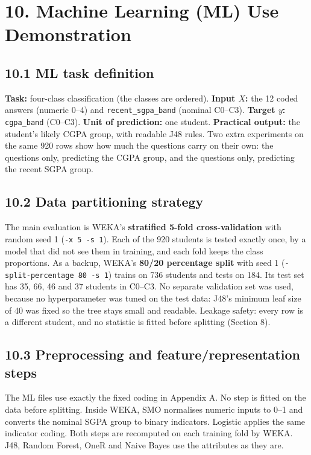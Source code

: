 \documentclass[11pt,a4paper]{article}
\begin{document}
\section{10. Machine Learning (ML) Use Demonstration}
\subsection{10.1 ML task definition}
\textbf{Task:} four-class classification (the classes are ordered). \textbf{Input $X$:} the 12 coded answers (numeric 0--4) and \texttt{recent\_sgpa\_band} (nominal C0--C3). \textbf{Target $y$:} \texttt{cgpa\_band} (C0--C3). \textbf{Unit of prediction:} one student. \textbf{Practical output:} the student's likely CGPA group, with readable J48 rules. Two extra experiments on the same 920 rows show how much the questions carry on their own: the questions only, predicting the CGPA group, and the questions only, predicting the recent SGPA group.

\subsection{10.2 Data partitioning strategy}
The main evaluation is WEKA's \textbf{stratified 5-fold cross-validation} with random seed 1 (\texttt{-x 5 -s 1}). Each of the 920 students is tested exactly once, by a model that did not see them in training, and each fold keeps the class proportions. As a backup, WEKA's \textbf{80/20 percentage split} with seed 1 (\texttt{-split-percentage 80 -s 1}) trains on 736 students and tests on 184. Its test set has 35, 66, 46 and 37 students in C0--C3. No separate validation set was used, because no hyperparameter was tuned on the test data: J48's minimum leaf size of 40 was fixed so the tree stays small and readable. Leakage safety: every row is a different student, and no statistic is fitted before splitting (Section 8).

\subsection{10.3 Preprocessing and feature/representation steps}
The ML files use exactly the fixed coding in Appendix A. No step is fitted on the data before splitting. Inside WEKA, SMO normalises numeric inputs to 0--1 and converts the nominal SGPA group to binary indicators. Logistic applies the same indicator coding. Both steps are recomputed on each training fold by WEKA. J48, Random Forest, OneR and Naive Bayes use the attributes as they are.
\end{document}
